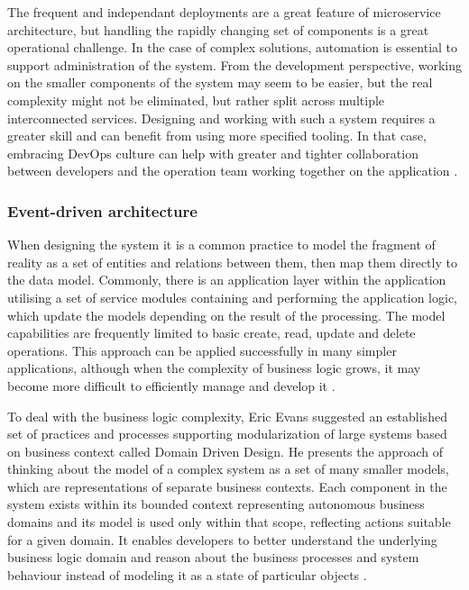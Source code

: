 The frequent and independant deployments are a great feature of microservice architecture, but handling the rapidly changing set of components is a great operational challenge. In the case of complex solutions, automation is essential to support administration of the system. From the development perspective, working on the smaller components of the system may seem to be easier, but the real complexity might not be eliminated, but rather split across multiple interconnected services. Designing and working with such a system requires a greater skill and can benefit from using more specified tooling. In that case, embracing DevOps culture can help with greater and tighter collaboration between developers and the operation team working together on the application \cite{FowlerMicroservicesTradeoffs}.

\subsubsection{Event-driven architecture}

When designing the system it is a common practice to model the fragment of reality as a set of entities and relations between them, then map them directly to the data model. Commonly, there is an application layer within the application utilising a set of service modules containing and performing the application logic, which update the models depending on the result of the processing. The model capabilities are frequently limited to basic create, read, update and delete operations. This approach can be applied successfully in many simpler applications, although when the complexity of business logic grows, it may become more difficult to efficiently manage and develop it \cite{FowlerAnemicModel}.

To deal with the business logic complexity, Eric Evans suggested an established set of practices and processes supporting modularization of large systems based on business context called Domain Driven Design. He presents the approach of thinking about the model of a complex system as a set of many smaller models, which are representations of separate business contexts. Each component in the system exists within its bounded context representing autonomous business domains and its model is used only within that scope, reflecting actions suitable for a given domain. It enables developers to better understand the underlying business logic domain and reason about the business processes and system behaviour instead of modeling it as a state of particular objects \cite{EvansDDD}.

